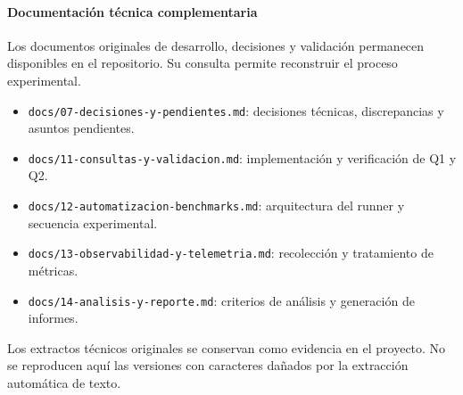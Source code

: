 
\paragraph{Documentación técnica complementaria}

Los documentos originales de desarrollo, decisiones y
validación permanecen disponibles en el repositorio.
Su consulta permite reconstruir el proceso experimental.

\begin{itemize}
\item \texttt{docs/07-decisiones-y-pendientes.md}:
decisiones técnicas, discrepancias y asuntos pendientes.

\item \texttt{docs/11-consultas-y-validacion.md}:
implementación y verificación de Q1 y Q2.

\item \texttt{docs/12-automatizacion-benchmarks.md}:
arquitectura del runner y secuencia experimental.

\item \texttt{docs/13-observabilidad-y-telemetria.md}:
recolección y tratamiento de métricas.

\item \texttt{docs/14-analisis-y-reporte.md}:
criterios de análisis y generación de informes.
\end{itemize}

Los extractos técnicos originales se conservan como
evidencia en el proyecto. No se reproducen aquí las
versiones con caracteres dañados por la extracción
automática de texto.
